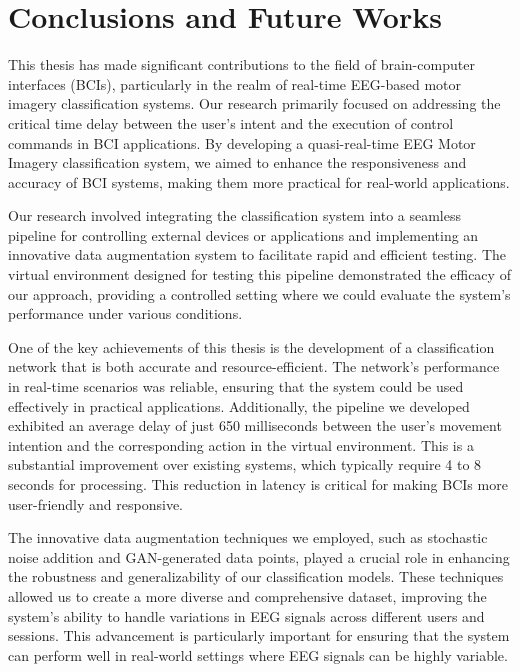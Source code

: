 \chapter{Conclusions and Future Works}\label{ch:conclusions}

This thesis has made significant contributions to the field of brain-computer interfaces (BCIs), particularly in the realm of real-time EEG-based motor imagery classification systems. 
Our research primarily focused on addressing the critical time delay between the user's intent and the execution of control commands in BCI applications. 
By developing a quasi-real-time EEG Motor Imagery classification system, we aimed to enhance the responsiveness and accuracy of BCI systems, making them more practical for real-world applications.

Our research involved integrating the classification system into a seamless pipeline for controlling external devices or applications and implementing an innovative data augmentation system to facilitate rapid and efficient testing. 
The virtual environment designed for testing this pipeline demonstrated the efficacy of our approach, providing a controlled setting where we could evaluate the system's performance under various conditions.

One of the key achievements of this thesis is the development of a classification network that is both accurate and resource-efficient. 
The network's performance in real-time scenarios was reliable, ensuring that the system could be used effectively in practical applications. 
Additionally, the pipeline we developed exhibited an average delay of just 650 milliseconds between the user's movement intention and the corresponding action in the virtual environment. 
This is a substantial improvement over existing systems, which typically require 4 to 8 seconds for processing.
This reduction in latency is critical for making BCIs more user-friendly and responsive.

The innovative data augmentation techniques we employed, such as stochastic noise addition and GAN-generated data points, played a crucial role in enhancing the robustness and generalizability of our classification models. 
These techniques allowed us to create a more diverse and comprehensive dataset, improving the system's ability to handle variations in EEG signals across different users and sessions. 
This advancement is particularly important for ensuring that the system can perform well in real-world settings where EEG signals can be highly variable.

